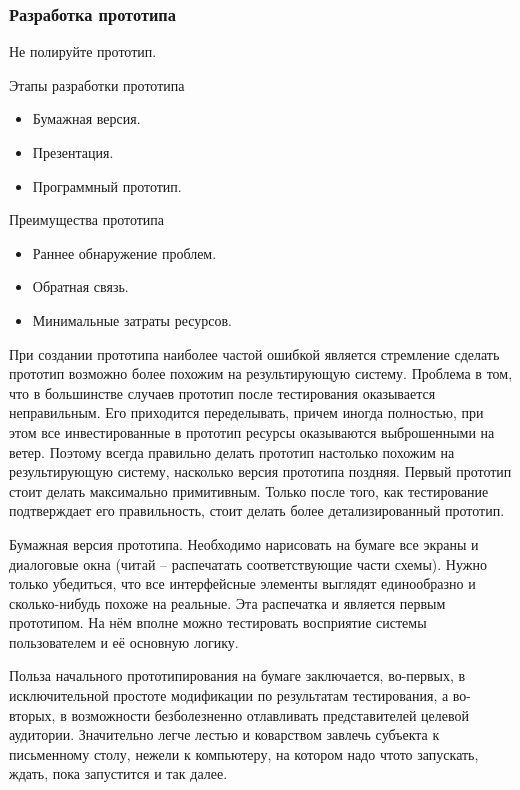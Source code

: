 \documentclass{../industrial-development}
\begin{document}
\begin{frame} \frametitle{Разработка прототипа}
  \begin{block}{}
   Не полируйте прототип.
  \end{block}

  \begin{block}{Этапы разработки прототипа}
   \begin{itemize}
   \item Бумажная версия.
   \item Презентация.
   \item Программный прототип.
   \end{itemize}
  \end{block}
  
  \begin{block}{Преимущества прототипа}
   \begin{itemize}
   \item Раннее обнаружение проблем.
   \item Обратная связь.
   \item Минимальные затраты ресурсов.
   \end{itemize}
  \end{block}
\end{frame}

\lecturenotes

При создании прототипа наиболее частой ошибкой является стремление сделать прототип возможно более похожим на результирующую систему. Проблема в том, что в большинстве случаев прототип после тестирования оказывается неправильным. Его приходится переделывать, причем иногда полностью, при этом все инвестированные в прототип ресурсы оказываются выброшенными на ветер. Поэтому всегда правильно делать прототип настолько похожим на результирующую систему, насколько версия прототипа поздняя. Первый прототип стоит делать максимально примитивным. Только после того, как тестирование подтверждает его правильность, стоит делать более детализированный прототип.

Бумажная версия прототипа. Необходимо нарисовать на бумаге все экраны и диалоговые окна (читай – распечатать соответствующие части схемы). Нужно только убедиться, что все интерфейсные элементы выглядят единообразно и сколько-нибудь похоже на реальные. Эта распечатка и является первым прототипом. На нём вполне можно тестировать восприятие системы пользователем и её основную логику.

Польза начального прототипирования на бумаге заключается, во-первых, в исключительной простоте модификации по результатам тестирования, а во-вторых, в возможности безболезненно отлавливать представителей целевой аудитории. Значительно легче лестью и коварством завлечь субъекта к письменному столу, нежели к компьютеру, на котором надо чтото запускать, ждать, пока запустится и так далее.
\end{document}
